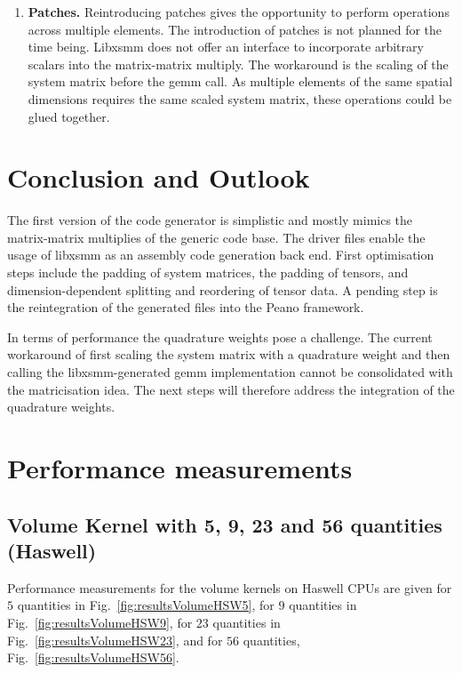 \documentclass{acm_proc_article-sp}
\begin{document}
\begin{enumerate}
\item \textbf{Patches.} Reintroducing patches gives the opportunity to perform operations across multiple elements. The introduction of patches is not planned for the time being. Libxsmm does not offer an interface to incorporate arbitrary scalars into the matrix-matrix multiply. The workaround is the scaling of the system matrix before the gemm call. As multiple elements of the same spatial dimensions requires the same scaled system matrix, these operations could be glued together.
\end{enumerate}


\section{Conclusion and Outlook}
The first version of the code generator is simplistic and mostly mimics the matrix-matrix multiplies of the generic code base. The driver files enable the usage of libxsmm as an assembly code generation back end. First optimisation steps include the padding of system matrices, the padding of tensors, and dimension-dependent splitting and reordering of tensor data. A pending step is the reintegration of the generated files into the Peano framework.

In terms of performance the quadrature weights pose a challenge. The current workaround of first scaling the system matrix with a quadrature weight and then calling the libxsmm-generated gemm implementation cannot be consolidated with the matricisation idea. The next steps will therefore address the integration of the quadrature weights. 





\newpage
\appendix
\section{Performance measurements} \label{App:Performance measurements}

\subsection{Volume Kernel with 5, 9, 23 and 56 quantities (Haswell)} \label{sec:app1}

Performance measurements for the volume kernels on Haswell CPUs are given for $5$ quantities in Fig.~\ref{fig:resultsVolumeHSW5}, for $9$ quantities in Fig.~\ref{fig:resultsVolumeHSW9}, for $23$ quantities in Fig.~\ref{fig:resultsVolumeHSW23}, and for $56$ quantities, Fig.~\ref{fig:resultsVolumeHSW56}.
\end{document}
